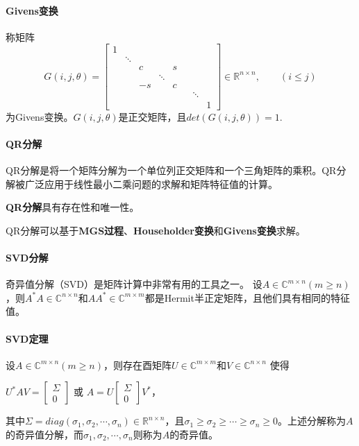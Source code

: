 \documentclass[UTF8]{article}
\begin{document}
\begin{flushleft}
\paragraph{Givens变换}
称矩阵
$$
G(i,j,\theta)=
\begin{bmatrix}
1 & & & & & \\
 & \ddots & & & & & \\
 &  & c & & s & & \\
 &  &   & \ddots &  &  & \\
 &  & -s &  & c &  & \\
 &  &   &  &  & & \ddots \\
 &  &   &  &  & & & 1
\end{bmatrix}
\in\mathbb{R}^{n \times n}, \qquad (i \leq j)
$$
为\textcolor[rgb]{0.00,0.07,1.00}{Givens变换}。$G(i,j,\theta)$是正交矩阵，且$det(G(i,j,\theta))=1$.

\paragraph{QR分解}
QR分解是将一个矩阵分解为一个\textcolor[rgb]{0.00,0.07,1.00}{单位列正交矩阵}和一个三角矩阵的乘积。QR分解被广泛应用于线性最小二乘问题的求解和矩阵特征值的计算。

\textbf{QR分解}具有\textcolor[rgb]{0.00,0.07,1.00}{存在性}和\textcolor[rgb]{0.00,0.07,1.00}{唯一性}。\vspace{1.2ex}

QR分解可以基于\textbf{\textcolor[rgb]{0.00,0.07,1.00}{MGS过程}}、\textbf{\textcolor[rgb]{0.00,0.07,1.00}{Householder变换}}和\textbf{\textcolor[rgb]{0.00,0.07,1.00}{Givens变换}}求解。

\paragraph{SVD分解}
奇异值分解（SVD）是矩阵计算中非常有用的工具之一。
设$A\in\mathbb{C}^{m \times n}(m \geq n)$，则$A^*A\in\mathbb{C}^{n \times n}$和$AA^*\in\mathbb{C}^{m \times m}$都是Hermit半正定矩阵，且他们具有相同的特征值。

\paragraph{SVD定理}
设$A\in\mathbb{C}^{m \times n}(m \geq n)$，则存在酉矩阵$U\in\mathbb{C}^{m \times m}$和$V\in\mathbb{C}^{n \times n}$ 使得
\begin{center}
$
U^*AV=
\begin{bmatrix}
\Sigma \\
0
\end{bmatrix}
$ 或 $
A=U
\begin{bmatrix}
\Sigma \\
0
\end{bmatrix}
V^*，
$
\end{center}
其中$\Sigma = diag(\sigma_1,\sigma_2,\cdots,\sigma_n)\in \mathbb{R}^{n \times n}$，且$\sigma_1 \geq \sigma_2 \geq \cdots \geq \sigma_n \geq 0$。上述分解称为$A$的奇异值分解，而$\sigma_1,\sigma_2,\cdots,\sigma_n$则称为$A$的奇异值。
\end{flushleft}
\end{document}
